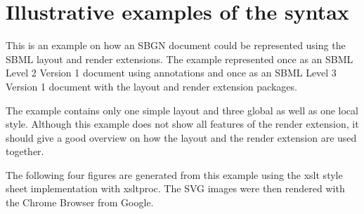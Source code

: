 
\section{Illustrative examples of the \Render syntax}
\label{examples}


This is an example on how an SBGN document could be represented using the SBML layout and render extensions. The example represented once as an SBML Level 2 Version 1 document using annotations and once as an SBML Level 3 Version 1 document with the layout and render extension packages.

The example contains only one simple layout and three global as well as one local style.
Although this example does not show all features of the render extension, it should give a good overview on how the layout and the render extension are used together.

The following four figures are generated from this example using the xslt style sheet implementation with xsltproc.
The SVG images were then rendered with the Chrome Browser from Google.

